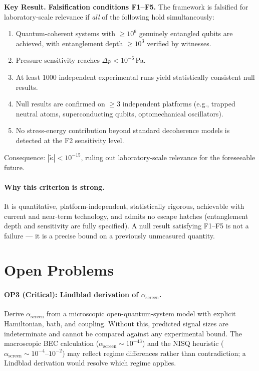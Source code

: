 \documentclass[12pt,letterpaper]{article}
\theoremstyle{plain}
\theoremstyle{definition}
\theoremstyle{remark}
\newenvironment{keyresult}{%
  \begin{framed}\noindent\textbf{Key Result.}\quad}{%
  \end{framed}}
\newcommand{\kt}{\tilde{\kappa}}
\newcommand{\asc}{\alpha_{\mathrm{screen}}}
\begin{document}
\begin{keyresult}
\textbf{Falsification conditions F1--F5.}  The framework is falsified for laboratory-scale
relevance if \emph{all} of the following hold simultaneously:

\begin{enumerate}
  \item[\textbf{F1}] Quantum-coherent systems with $\geq 10^{6}$ genuinely entangled qubits
        are achieved, with entanglement depth $\geq 10^{3}$ verified by witnesses.
  \item[\textbf{F2}] Pressure sensitivity reaches $\Delta p < 10^{-6}$\,Pa.
  \item[\textbf{F3}] At least 1000 independent experimental runs yield statistically
        consistent null results.
  \item[\textbf{F4}] Null results are confirmed on $\geq 3$ independent platforms (e.g.,
        trapped neutral atoms, superconducting qubits, optomechanical oscillators).
  \item[\textbf{F5}] No stress-energy contribution beyond standard decoherence models is
        detected at the F2 sensitivity level.
\end{enumerate}

Consequence: $|\kt| < 10^{-15}$, ruling out laboratory-scale relevance for the foreseeable
future.
\end{keyresult}

\paragraph{Why this criterion is strong.}
It is quantitative, platform-independent, statistically rigorous, achievable with current and
near-term technology, and admits no escape hatches (entanglement depth and sensitivity are
fully specified).  A null result satisfying F1--F5 is not a failure --- it is a precise bound
on a previously unmeasured quantity.

\section{Open Problems}
\label{sec:open}

\paragraph{OP3 (Critical): Lindblad derivation of $\asc$.}
Derive $\asc$ from a microscopic open-quantum-system model with explicit Hamiltonian, bath,
and coupling.  Without this, predicted signal sizes are indeterminate and cannot be compared
against any experimental bound.  The macroscopic BEC calculation ($\asc \sim 10^{-43}$) and
the NISQ heuristic ($\asc \sim 10^{-4}$--$10^{-2}$) may reflect regime differences rather
than contradiction; a Lindblad derivation would resolve which regime applies.
\end{document}
